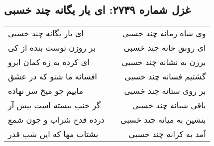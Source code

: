 \begin{center}
\section*{غزل شماره ۲۷۳۹: ای یار یگانه چند خسبی}
\label{sec:2739}
\begin{longtable}{l p{0.5cm} r}
ای یار یگانه چند خسبی
&&
وی شاه زمانه چند خسبی
\\
بر روزن توست بنده از کی
&&
ای رونق خانه چند خسبی
\\
ای کرده به زه کمان ابرو
&&
برزن به نشانه چند خسبی
\\
افسانه ما شنو که در عشق
&&
گشتیم فسانه چند خسبی
\\
ماییم چو میخ سر نهاده
&&
بر روی ستانه چند خسبی
\\
گر خنب ببسته است پیش آر
&&
باقی شبانه چند خسبی
\\
درده قدح شراب و چون شمع
&&
بنشین به میانه چند خسبی
\\
بشتاب مها که این شب قدر
&&
آمد به کرانه چند خسبی
\\
\end{longtable}
\end{center}
